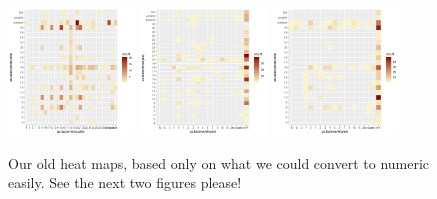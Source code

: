 \documentclass[11pt,letter]{article}
\begin{document}
\begin{figure}[t!]
\centering
\includegraphics[width=0.3\textwidth]{..//..//analyses/limitingcues/figures/heatmapforcexphoto.pdf}
\includegraphics[width=0.3\textwidth]{..//..//analyses/limitingcues/figures/heatmapchillxforce.pdf}
\includegraphics[width=0.3\textwidth]{..//..//analyses/limitingcues/figures/heatmapchillxphoto.pdf}
\caption{Our old heat maps, based only on what we could convert to numeric easily. See the next two figures please!}
  \label{fig:heatmaps} %
\end{figure}
\clearpage
\end{document}
